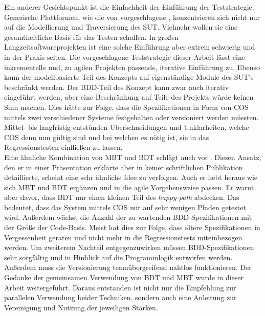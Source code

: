 Ein anderer Gesichtspunkt ist die Einfachheit der Einführung der Teststrategie. Generische Plattformen, wie die von \citeauthor{zech_generic_2012} vorgeschlagene \cite{zech_generic_2012}, konzentrieren sich nicht nur auf die Modellierung und Traversierung des \Gls{SUT}. Vielmehr wollen sie eine gesamtheitliche Basis für das Testen schaffen. In großen Langzeitsoftwareprojekten ist eine solche Einführung aber extrem schwierig und in der Praxis selten. Die vorgeschlagene Teststrategie dieser Arbeit lässt eine inkrementelle und, zu agilen Projekten passende, iterative Einführung zu. Ebenso kann der modellbasierte Teil des Konzepts auf eigenständige Module des \Gls{SUT}'s beschränkt werden. Der BDD-Teil des Konzept kann zwar auch iterativ eingeführt werden, aber eine Beschränkung auf Teile des Projekts würde keinen Sinn machen. Dies hätte zur Folge, dass die Spezifikationen in Form von \Gls{COS} mittels zwei verschiedener Systeme festgehalten oder versioniert werden müssten. Mittel- bis langfristig entstünden Überschneidungen und Unklarheiten, welche \Gls{COS} denn nun gültig sind und bei welchen es nötig ist, sie in das Regressionstesten einfließen zu lassen.\\
Eine ähnliche Kombination von \Gls{MBT} und \Gls{BDT} schlägt auch \citeauthor{binder_model-based_2014} vor \cite{binder_model-based_2014}. Diesen Ansatz, den er in einer Präsentation \cite{binder_model-based_2014} erklärte aber in keiner schriftlichen Publikation detaillierte, scheint eine sehr ähnliche Idee zu verfolgen. Auch er hebt heraus wie sich \Gls{MBT} und \Gls{BDT} ergänzen und in die agile Vorgehensweise passen. Er warnt aber davor, dass \Gls{BDT} nur einen kleinen Teil des \textit{happy-path} abdecken. Das bedeutet, dass das System mittels \Gls{COS} nur auf sehr wenigen Pfaden getestet wird. Außerdem wächst die Anzahl der zu wartenden \Gls{BDD}-Spezifikationen mit der Größe der Code-Basis. Meist hat dies zur Folge, dass ältere Spezifikationen in Vergessenheit geraten und nicht mehr in die Regressionstests miteinbezogen werden. Um zweiterem Nachteil entgegenzuwirken müssen \Gls{BDD}-Spezifikationen sehr sorgfältig und in Hinblick auf die Programmlogik entworfen werden. Außerdem muss die Versionierung teamübergreifend nahtlos funktionieren. Der Gedanke der gemeinsamen Verwendung von \Gls{BDT} und \Gls{MBT} wurde in dieser Arbeit weitergeführt. Daraus entstanden ist nicht nur die Empfehlung zur parallelen Verwendung beider Techniken, sondern auch eine Anleitung zur Vereinigung und Nutzung der jeweiligen Stärken. \\
